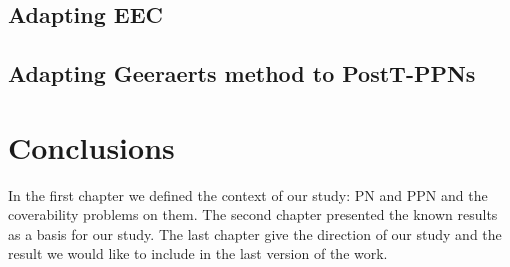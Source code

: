 \documentclass[11pt,a4paper,oneside]{book}
\theoremstyle{plain}
\theoremstyle{definition}
\theoremstyle{remark}
\begin{document}
\section{Adapting \ac{EEC}}%

\section{Adapting Geeraerts method to PostT-\acp{PPN}}


\vspace*{0.5cm}
\acresetall
\chapter*{Conclusions}

In the first chapter we defined the context of our study: \ac{PN} and \ac{PPN} and the coverability problems on them.
The second chapter presented the known results as a basis for our study.
The last chapter give the direction of our study and the result we would like to include in the last version of the work.

\appendix

\backmatter

\printindex %



\end{document}
